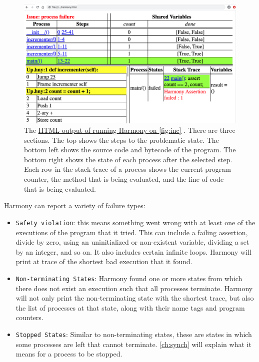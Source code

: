 \documentclass{report}
\newcommand{\harmonyref}[2]{%
\href{https://www.cs.cornell.edu/home/rvr/harmony/output/#1}{\underline{#2}}%
}
\begin{document}
\begin{figure}
\includegraphics[width=\textwidth]{figures/Up1.png}
\caption{The
\harmonyref{Up.html}{HTML output of running Harmony on \autoref{fig:inc}}.
There are three sections.
The top shows the steps to the problematic state.
The bottom left shows the source code and bytecode
of the program.
The bottom right shows the state of each process after the selected step.
Each row in the stack trace of a process shows the current program counter,
the method that is being evaluated, and the line of code that is
being evaluated.}
\label{fig:inchtml1}
\end{figure}

Harmony can report a variety of failure types:
\begin{itemize}
\item \texttt{Safety violation}: this means something went wrong with
at least one of the executions of the program that it tried.  This
can include a failing assertion, divide by zero, using an uninitialized
or non-existent variable, dividing a set by an integer, and so on.
It also includes certain infinite loops.
Harmony will print at trace of the shortest bad execution that it found.
\item \texttt{Non-terminating States}: Harmony found one or more states
from which there does not exist an execution such that all processes
terminate.  Harmony will not only print the non-terminating state with
the shortest trace, but also the list of processes
at that state, along with their name tags and program counters.
\item \texttt{Stopped States}: Similar to non-terminating states,
these are states in which some processes are left that cannot
terminate.  \autoref{ch:synch} will explain what it means for
a process to be stopped.
\end{itemize}
\end{document}

